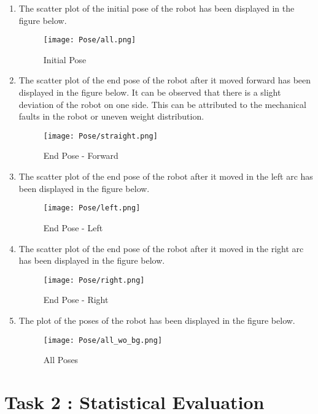 \begin{enumerate}
	\item
	The scatter plot of the initial pose of the robot has been displayed in the figure below.

\begin{figure}[H]
	\centering
	\texttt{[image: Pose/all.png]}
	\caption{Initial Pose}
\end{figure}

\newpage
\item
The scatter plot of the end pose of the robot after it moved forward has been displayed in the figure below.
It can be observed that there is a slight deviation of the robot on one side. This can be attributed to the 
mechanical faults in the robot or uneven weight distribution.
\begin{figure}[H]
	\centering
	\texttt{[image: Pose/straight.png]}
	\caption{End Pose - Forward}
\end{figure}



\newpage
\item
The scatter plot of the end pose of the robot after it moved in the left arc has been displayed in the figure below.

\begin{figure}[H]
	\centering
	\texttt{[image: Pose/left.png]}
	\caption{End Pose - Left}
\end{figure}


\newpage
\item
The scatter plot of the end pose of the robot after it moved in the right arc has been displayed in the figure below.

\begin{figure}[H]
	\centering
	\texttt{[image: Pose/right.png]}
	\caption{End Pose - Right}
\end{figure}



\newpage
\item
The plot of the poses of the robot has been displayed in the figure below.

\begin{figure}[H]
	\centering
	\texttt{[image: Pose/all\_wo\_bg.png]}
	\caption{All Poses}
\end{figure}


\end{enumerate}

\newpage
\section{Task 2 : Statistical Evaluation}

